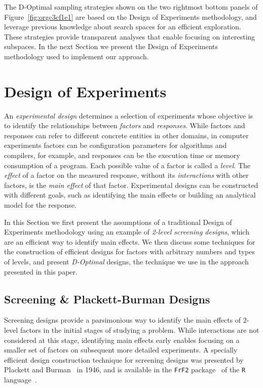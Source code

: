 \documentclass[conference]{IEEEtran}
\begin{document}
The D-Optimal sampling strategies shown on the two rightmost bottom panels of
Figure~\ref{fig:orgc3cf1e1} are based on the Design of Experiments
methodology, and leverage previous knowledge about search spaces for an
efficient exploration. These strategies provide transparent analyses that
enable focusing on interesting subspaces. In the next
Section we present the Design of Experiments methodology used to implement our
approach.
\section{Design of Experiments}
\label{sec:org7e9f5c3}
An \emph{experimental design} determines a selection of experiments whose objective
is to identify the relationships between \emph{factors} and \emph{responses}. While
factors and responses can refer to different concrete entities in other domains,
in computer experiments factors can be configuration parameters for algorithms
and compilers, for example, and responses can be the execution time or memory
consumption of a program. Each possible value of a factor is called a \emph{level}.
The \emph{effect} of a factor on the measured response, without its \emph{interactions}
with other factors, is the \emph{main effect} of that factor. Experimental designs
can be constructed with different goals, such as identifying the main effects
or building an analytical model for the response.

In this Section we first present the assumptions of a traditional Design of
Experiments methodology using an example of \emph{2-level screening designs}, which
are an efficient way to identify main effects. We then discuss some techniques
for the construction of efficient designs for factors with arbitrary numbers and
types of levels, and present \emph{D-Optimal} designs, the technique we use in the
approach presented in this paper.
\subsection{Screening \& Plackett-Burman Designs}
\label{sec:orgd5313a5}
Screening designs provide a parsimonious way to identify the main
effects of 2-level factors in the initial stages of studying a problem. While
interactions are not considered at this stage, identifying main effects early
enables focusing on a smaller set of factors on subsequent more detailed
experiments. A specially efficient design construction technique for screening
designs was presented by Plackett and Burman~\cite{plackett1946design} in
1946, and is available in the \texttt{FrF2}
package~\cite{gromping2014frf2} of the \texttt{R}
language~\cite{team2018rlanguage}.
\end{document}
